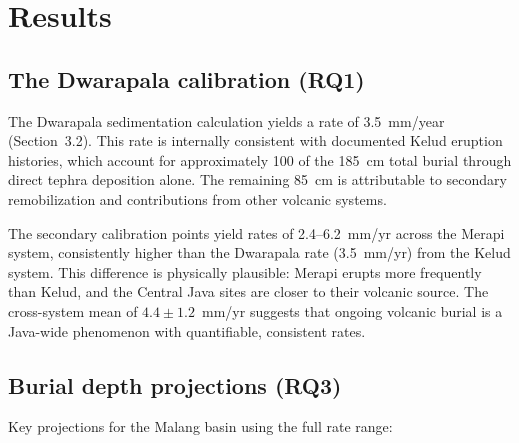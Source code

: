 \documentclass[12pt,letterpaper]{article}
\begin{document}
\section{Results}

\subsection{The Dwarapala calibration (RQ1)}

The Dwarapala sedimentation calculation yields a rate of 3.5~mm/year (Section~3.2). This rate is internally consistent with documented Kelud eruption histories, which account for approximately 100 of the 185~cm total burial through direct tephra deposition alone. The remaining 85~cm is attributable to secondary remobilization and contributions from other volcanic systems.

The secondary calibration points yield rates of 2.4--6.2~mm/yr across the Merapi system, consistently higher than the Dwarapala rate (3.5~mm/yr) from the Kelud system. This difference is physically plausible: Merapi erupts more frequently than Kelud, and the Central Java sites are closer to their volcanic source. The cross-system mean of $4.4 \pm 1.2$~mm/yr suggests that ongoing volcanic burial is a Java-wide phenomenon with quantifiable, consistent rates.

\subsection{Burial depth projections (RQ3)}

Key projections for the Malang basin using the full rate range:

\begin{table}[htbp]
\centering
\caption{Projected burial depth by era using empirically-derived sedimentation rates.}
\label{tab:depth}
\end{table}
\end{document}
